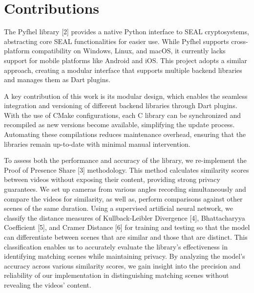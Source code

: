 \section{Contributions}
The Pyfhel library [2] provides a native Python interface to SEAL cryptosystems, abstracting core SEAL functionalities for easier use. While Pyfhel supports cross-platform compatibility on Windows, Linux, and macOS, it currently lacks support for mobile platforms like Android and iOS. This project adopts a similar approach, creating a modular interface that supports multiple backend libraries and manages them as Dart plugins.

A key contribution of this work is its modular design, which enables the seamless integration and versioning of different backend libraries through Dart plugins. With the use of CMake configurations, each C library can be synchronized and recompiled as new versions become available, simplifying the update process. Automating these compilations reduces maintenance overhead, ensuring that the libraries remain up-to-date with minimal manual intervention.

To assess both the performance and accuracy of the library, we re-implement the Proof of Presence Share [3] methodology. This method calculates similarity scores between videos without exposing their content, providing strong privacy guarantees. We set up cameras from various angles recording simultaneously and compare the videos for similarity, as well as, perform comparisons against other scenes of the same duration. Using a supervised artificial neural network, we classify the distance measures of Kullback-Leibler Divergence [4], Bhattacharyya Coefficient [5], and Cramer Distance [6] for training and testing so that the model can differentiate between scenes that are similar and those that are distinct. This classification enables us to accurately evaluate the library's effectiveness in identifying matching scenes while maintaining privacy. By analyzing the model’s accuracy across various similarity scores, we gain insight into the precision and reliability of our implementation in distinguishing matching scenes without revealing the videos’ content.